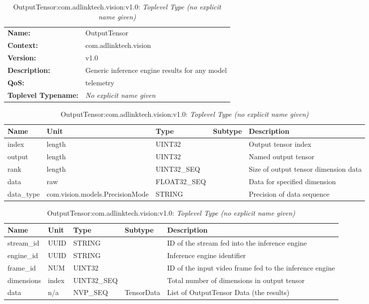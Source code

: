 \begin{table}[H]
\begin{tabularx}{\textwidth}{l X} 
       \textbf{Name:} & OutputTensor \\ 
	   \textbf{Context:} & com.adlinktech.vision \\ 
	   \textbf{Version:} & v1.0 \\ 
	   \textbf{Description:} & Generic inference engine results for any model \\ 
	   \textbf{QoS:} & telemetry \\
	   \textbf{Toplevel Typename:} & \textit{No explicit name given} \\ 
\end{tabularx}
\caption{OutputTensor:com.adlinktech.vision:v1.0}\label{OutputTensorTagGroup.json:table:OutputTensor}
\bigskip
\begin{tabularx}{\textwidth}{l l l l X} 
	 \textbf{Name} & \textbf{Unit} & \textbf{Type} & \textbf{Subtype} & \textbf{Description} \\
	 \midrule
   index & length & UINT32 &  & Output tensor index \\
   output & length & UINT32 &  & Named output tensor \\
   rank & length & UINT32\_SEQ &  & Size of output tensor dimension data \\
   data & raw & FLOAT32\_SEQ &  & Data for specified dimension \\
   data\_type & com.vision.models.PrecisionMode & STRING &  & Precision of data sequence \\
\end{tabularx}
\caption{OutputTensor:com.adlinktech.vision:v1.0: TensorData}\label{OutputTensorTagGroup.json:table:OutputTensor-TensorData}

\bigskip
\begin{tabularx}{\textwidth}{l l l l X} 
	 \textbf{Name} & \textbf{Unit} & \textbf{Type} & \textbf{Subtype} & \textbf{Description} \\
	 \midrule
   stream\_id & UUID & STRING &  & ID of the stream fed into the inference engine \\
   engine\_id & UUID & STRING &  & Inference engine identifier \\
   frame\_id & NUM & UINT32 &  & ID of the input video frame fed to the inference engine \\
   dimensions & index & UINT32\_SEQ &  & Total number of dimensions in output tensor \\
   data & n/a & NVP\_SEQ & TensorData & List of OutputTensor Data (the results) \\
\end{tabularx}
\caption{OutputTensor:com.adlinktech.vision:v1.0: \textit{Toplevel Type (no explicit name given)}}\label{OutputTensorTagGroup.json:table:OutputTensor-no-type-given}


\end{table}

